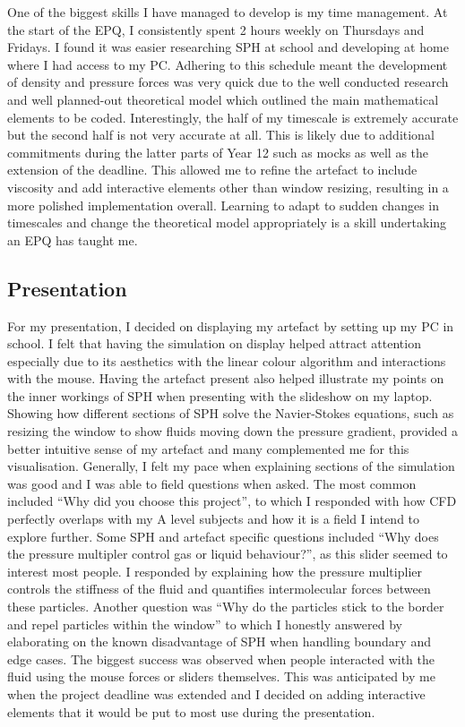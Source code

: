 \documentclass[write-up.tex]{subfiles}
\begin{document}
One of the biggest skills I have managed to develop is my time management. At the start of the EPQ, I consistently spent 2 hours weekly on Thursdays and Fridays. I found it was easier researching SPH at school and developing at home where I had access to my PC. Adhering to this schedule meant the development of density and pressure forces was very quick due to the well conducted research and well planned-out theoretical model which outlined the main mathematical elements to be coded. Interestingly, the half of my timescale is extremely accurate but the second half is not very accurate at all. This is likely due to additional commitments during the latter parts of Year 12 such as mocks as well as the extension of the deadline. This allowed me to refine the artefact to include viscosity and add interactive elements other than window resizing, resulting in a more polished implementation overall. Learning to adapt to sudden changes in timescales and change the theoretical model appropriately is a skill undertaking an EPQ has taught me.
 \subsection{Presentation}
For my presentation, I decided on displaying my artefact by setting up my PC in school. I felt that having the simulation on display helped attract attention especially due to its aesthetics with the linear colour algorithm and interactions with the mouse. Having the artefact present also helped illustrate my points on the inner workings of SPH when presenting with the slideshow on my laptop. Showing how different sections of SPH solve the Navier-Stokes equations, such as resizing the window to show fluids moving down the pressure gradient, provided a better intuitive sense of my artefact and many complemented me for this visualisation. Generally, I felt my pace when explaining sections of the simulation was good and I was able to field questions when asked. The most common included ``Why did you choose this project'', to which I responded with how CFD perfectly overlaps with my A level subjects and how it is a field I intend to explore further. Some SPH and artefact specific questions included ``Why does the pressure multipler control gas or liquid behaviour?'', as this slider seemed to interest most people. I responded by explaining how the pressure multiplier controls the stiffness of the fluid and quantifies intermolecular forces between these particles. Another question was ``Why do the particles stick to the border and repel particles within the window'' to which I honestly answered by elaborating on the known disadvantage of SPH when handling boundary and edge cases. The biggest success was observed when people interacted with the fluid using the mouse forces or sliders themselves. This was anticipated by me when the project deadline was extended and I decided on adding interactive elements that it would be put to most use during the presentation.
 
\end{document}
